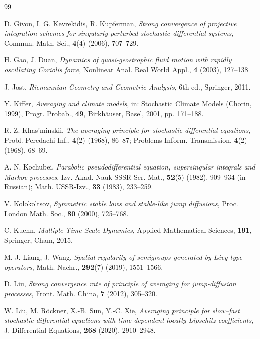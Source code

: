 \documentclass[11pt,reqno]{amsart}
\numberwithin{equation}{section}
\begin{document}
\begin{thebibliography}{99}
      
	 D. Givon, I. G. Kevrekidis, R. Kupferman, \textit{Strong convergence of projective integration schemes for singularly perturbed stochastic differential systems}, Commun. Math. Sci., \textbf{4}(4) (2006), 707–729.

	 H. Gao, J. Duan, \textit{Dynamics of quasi-geostrophic fluid motion with rapidly oscillating Coriolis force}, Nonlinear Anal. Real World Appl., \textbf{4} (2003), 127–138


    
	 J. Jost, \textit{Riemannian Geometry and Geometric Analysis}, 6th ed., Springer, 2011.



 Y. Kiffer, \textit{Averaging and climate models}, in: Stochastic Climate Models (Chorin, 1999), Progr. Probab., \textbf{49}, Birkhäuser, Basel, 2001, pp. 171–188.


    
	 R. Z. Khas'minskii, \textit{The averaging principle for stochastic differential equations}, Probl. Peredachi Inf., \textbf{4}(2) (1968), 86–87; Problems Inform. Transmission, \textbf{4}(2) (1968), 68–69.
	
	 A. N. Kochubei, \textit{Parabolic pseudodifferential equation, supersingular integrals and Markov processes}, Izv. Akad. Nauk SSSR Ser. Mat., \textbf{52}(5) (1982), 909–934 (in Russian); Math. USSR-Izv., \textbf{33} (1983), 233–259.
	
	 V. Kolokoltsov, \textit{Symmetric stable laws and stable-like jump diffusions}, Proc. London Math. Soc., \textbf{80} (2000), 725–768.
	
	 C. Kuehn, \textit{Multiple Time Scale Dynamics}, Applied Mathematical Sciences, \textbf{191}, Springer, Cham, 2015.
	
	
	 M.-J. Liang, J. Wang, \textit{Spatial regularity of semigroups generated by Lévy type operators}, Math. Nachr., \textbf{292}(7) (2019), 1551–1566.
	
	 D. Liu, \textit{Strong convergence rate of principle of averaging for jump-diffusion processes}, Front. Math. China, \textbf{7} (2012), 305–320.
	
	 W. Liu, M. Röckner, X.-B. Sun, Y.-C. Xie, \textit{Averaging principle for slow–fast stochastic differential equations with time dependent locally Lipschitz coefficients}, J. Differential Equations, \textbf{268} (2020), 2910–2948.
	

\end{thebibliography}
\end{document}
